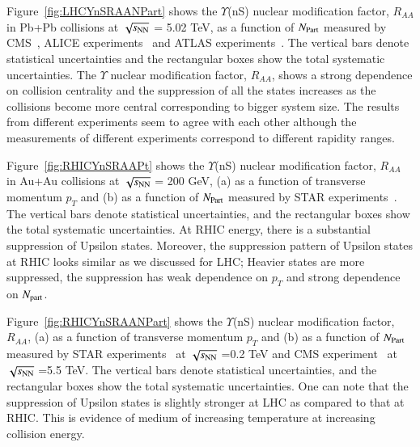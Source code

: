 Figure~\ref{fig:LHCYnSRAANPart} shows
the $\Upsilon$(nS) nuclear modification factor, $R_{AA}$
in Pb+Pb collisions at $\sqrt{s_{\rm NN}}$ = 5.02 TeV, as a function of $N_{\rm Part}$
measured by CMS~\cite{CMS:2018zza}, ALICE experiments~\cite{ALICE:2020wwx}
and ATLAS experiments~\cite{ALICE:2020wwx}.
 The vertical bars denote statistical uncertainties and the rectangular
boxes show the total systematic uncertainties. The $\Upsilon$ nuclear modification
factor, $R_{AA}$, shows a strong dependence on collision centrality and the
suppression of all the states increases as the collisions become more central
corresponding to bigger system size. The results from different experiments
seem to agree with each other although the measurements of different experiments
correspond to different rapidity ranges. 

    
Figure~\ref{fig:RHICYnSRAAPt} shows the $\Upsilon$(nS) nuclear modification factor, $R_{AA}$
in Au+Au collisions at $\sqrt{s_{\rm NN}}$ = 200 GeV,
 (a) as a function of transverse momentum $p_{T}$
and (b) as a function of $N_{\rm Part}$ measured by STAR
experiments~\cite{Wang:2019vau}. The vertical bars denote
statistical uncertainties, and the rectangular boxes show the total systematic
uncertainties. At RHIC energy, there is a substantial suppression of Upsilon states.
Moreover, the suppression pattern of Upsilon states at RHIC 
looks similar as we discussed for LHC; Heavier states are more suppressed,
the suppression has weak dependence on $p_T$ and strong dependence on $N_{\rm part}$.



Figure~\ref{fig:RHICYnSRAANPart} shows
  the $\Upsilon$(nS) nuclear modification factor, $R_{AA}$, (a) as a function of transverse momentum $p_{T}$
  and (b) as a function of $N_{\rm Part}$ measured by STAR experiments~\cite{Wang:2019vau} at $\sqrt{s_{\rm NN}}$ =0.2 TeV and
  CMS experiment~\cite{CMS:2018zza} at $\sqrt{s_{\rm NN}}$ =5.5 TeV.
The vertical bars denote statistical uncertainties, and the
rectangular boxes show the total systematic uncertainties.
One can note that the suppression of Upsilon states is slightly stronger at
LHC as compared to that at RHIC. This is evidence of medium of increasing
temperature at increasing collision energy.


